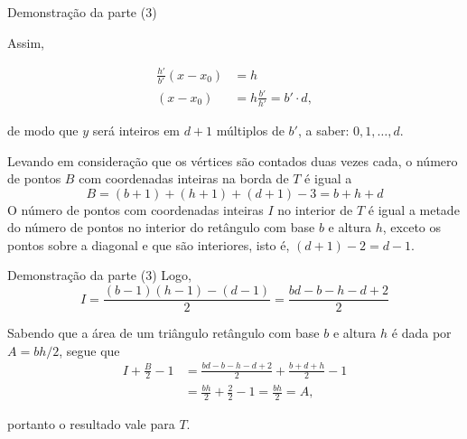 \begin{frame}[fragile]{Demonstração da parte (3)}

    Assim,

    \begin{align*}
        \frac{h'}{b'}(x - x_0) &= h\\
        (x - x_0) &= h\frac{b'}{h'} = b'\cdot d,
    \end{align*}

    de modo que $y$ será inteiros em $d + 1$ múltiplos de $b'$, a saber: $0, 1, \ldots, d$.
        \pause

    Levando em consideração que os vértices são contados duas vezes cada, o número de pontos $B$
    com coordenadas inteiras na borda de $T$ é igual a
    \[
        B = (b + 1) + (h + 1) + (d + 1) - 3 = b + h + d
    \] \pause
    O número de pontos com coordenadas inteiras $I$ no interior de $T$ é igual a metade do
    número de pontos no interior do retângulo com base $b$ e altura $h$, exceto os pontos sobre
    a diagonal e que são interiores, isto é, $(d + 1) - 2 = d - 1$.
\end{frame}

\begin{frame}[fragile]{Demonstração da parte (3)}
    Logo,
    \[
        I = \frac{(b - 1)(h - 1) - (d - 1)}{2} = \frac{bd - b - h - d + 2}{2}
    \]
        \pause

    Sabendo que a área de um triângulo retângulo com base $b$ e altura $h$ é dada por
    $A = bh/2$, segue que
    \begin{align*}
        I + \frac{B}{2} - 1 &= \frac{bd - b - h - d + 2}{2} + \frac{b + d + h}{2} - 1 \\
        &= \frac{bh}{2} + \frac{2}{2} - 1 = \frac{bh}{2} = A,
    \end{align*}

    portanto o resultado vale para $T$.
\end{frame}

